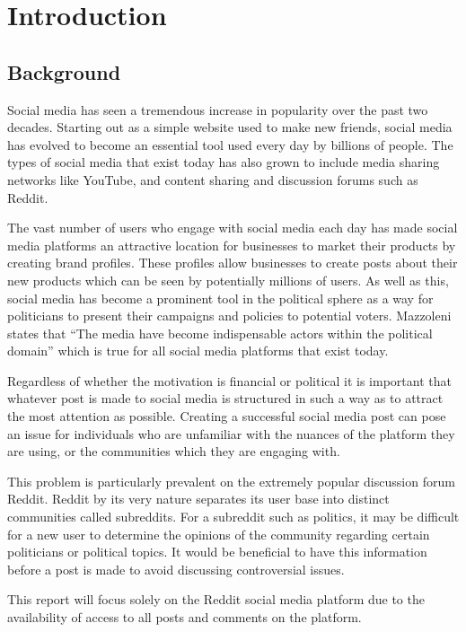 \chapter{Introduction}
 \setcounter{page}{1}

\section{Background}
Social media has seen a tremendous increase in popularity over the past two decades. Starting out as a simple website used to make new friends, social media has evolved to become an essential tool used every day by billions of people. The types of social media that exist today has also grown to include media sharing networks like YouTube, and content sharing and discussion forums such as Reddit.

The vast number of users who engage with social media each day has made social media platforms an attractive location for businesses to market their products by creating brand profiles. These profiles allow businesses to create posts about their new products which can be seen by potentially millions of users. As well as this, social media has become a prominent tool in the political sphere as a way for politicians to present their campaigns and policies to potential voters. Mazzoleni \cite{10} states that “The media have become indispensable actors within the political domain” which is true for all social media platforms that exist today.

Regardless of whether the motivation is financial or political it is important that whatever post is made to social media is structured in such a way as to attract the most attention as possible. Creating a successful social media post can pose an issue for individuals who are unfamiliar with the nuances of the platform they are using, or the communities which they are engaging with. 

This problem is particularly prevalent on the extremely popular discussion forum Reddit. Reddit by its very nature separates its user base into distinct communities called subreddits. For a subreddit such as politics, it may be difficult for a new user to determine the opinions of the community regarding certain politicians or political topics. It would be beneficial to have this information before a post is made to avoid discussing controversial issues.

This report will focus solely on the Reddit social media platform due to the availability of access to all posts and comments on the platform.


